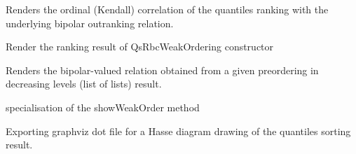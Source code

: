 \documentclass[letterpaper,10pt,english]{sphinxmanual}
\begin{document}
\begin{fulllineitems}
\begin{fulllineitems}
\label{techDoc:weakOrders.QuantilesRankingDigraph.computeOutrankingCorrelation}
Renders the ordinal (Kendall) correlation of the quantiles ranking
with the underlying bipolar outranking relation.

\end{fulllineitems}


\begin{fulllineitems}
\label{techDoc:weakOrders.QuantilesRankingDigraph.computeQsRbcRanking}
Render the ranking result of QsRbcWeakOrdering constructor

\end{fulllineitems}


\begin{fulllineitems}
\label{techDoc:weakOrders.QuantilesRankingDigraph.computeRankingRelation}
Renders the bipolar-valued relation obtained from
a given preordering in decreasing levels (list of lists) result.

\end{fulllineitems}


\begin{fulllineitems}
\label{techDoc:weakOrders.QuantilesRankingDigraph.computeWeakOrder}
specialisation of the showWeakOrder method

\end{fulllineitems}


\begin{fulllineitems}
\label{techDoc:weakOrders.QuantilesRankingDigraph.exportSortingGraphViz}
Exporting graphviz dot file for a Hasse diagram drawing
of the quantiles sorting result.


\end{fulllineitems}
\end{fulllineitems}
\end{document}
